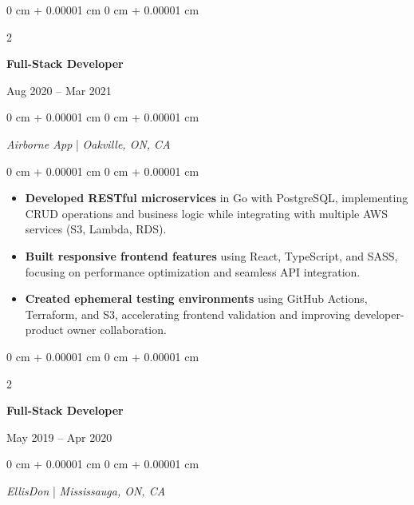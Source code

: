 \documentclass[11pt, letterpaper]{article}
\newenvironment{highlights}{
\begin{itemize}[
topsep=0.10 cm,
parsep=0.10 cm,
partopsep=0pt,
itemsep=0pt,
leftmargin=0 cm + 20pt
]
}{
\end{itemize}
} %
\newenvironment{onecolentry}{
\begin{adjustwidth}{
0 cm + 0.00001 cm
}{
0 cm + 0.00001 cm
}
}{
\end{adjustwidth}
} %
\newenvironment{twocolentry}[2][]{
\onecolentry
\def\secondColumn{#2}
\setcolumnwidth{\fill, 4.5 cm}
\begin{paracol}{2}
}{
\switchcolumn \raggedleft \secondColumn
\end{paracol}
\endonecolentry
} %
\begin{document}
\vspace{0.2 cm}

\begin{twocolentry}{
Aug 2020 – Mar 2021
}
\textbf{Full-Stack Developer}
\end{twocolentry}

\begin{onecolentry}
\textit{Airborne App} | \textit{Oakville, ON, CA}
\end{onecolentry}

\vspace{0.10 cm}
\begin{onecolentry}
\begin{highlights}
\item \textbf{Developed RESTful microservices} in Go with PostgreSQL, implementing CRUD operations and business logic while integrating with multiple AWS services (S3, Lambda, RDS).
\vspace{0.05 cm}

\item \textbf{Built responsive frontend features} using React, TypeScript, and SASS, focusing on performance optimization and seamless API integration.
\vspace{0.05 cm}


\item \textbf{Created ephemeral testing environments} using GitHub Actions, Terraform, and S3, accelerating frontend validation and improving developer-product owner collaboration.
\end{highlights}
\end{onecolentry}

\vspace{0.2 cm}

\begin{twocolentry}{
May 2019 – Apr 2020
}
\textbf{Full-Stack Developer}
\end{twocolentry}

\begin{onecolentry}
\textit{EllisDon} | \textit{Mississauga, ON, CA}
\end{onecolentry}
\end{document}
